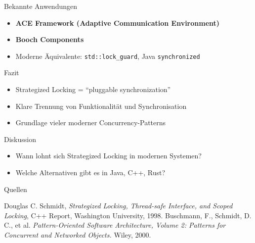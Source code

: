 \documentclass[aspectratio=169,10pt]{beamer}
\begin{document}
\begin{frame}{Bekannte Anwendungen}
  \begin{itemize}
    \item \textbf{ACE Framework (Adaptive Communication Environment)}
    \item \textbf{Booch Components}
    \item Moderne \"Aquivalente: \texttt{std::lock\_guard}, Java \texttt{synchronized}
  \end{itemize}
\end{frame}

\begin{frame}{Fazit}
  \begin{itemize}
    \item Strategized Locking = ``pluggable synchronization''
    \item Klare Trennung von Funktionalit\"at und Synchronisation
    \item Grundlage vieler moderner Concurrency-Patterns
  \end{itemize}
\end{frame}

\begin{frame}{Diskussion}
  \begin{itemize}
    \item Wann lohnt sich Strategized Locking in modernen Systemen?
    \item Welche Alternativen gibt es in Java, C++, Rust?
  \end{itemize}
\end{frame}

\begin{frame}[allowframebreaks]{Quellen}
  \begin{thebibliography}{9}
    Douglas C. Schmidt,
    \emph{Strategized Locking, Thread-safe Interface, and Scoped Locking},
    C++ Report, Washington University, 1998.
    Buschmann, F., Schmidt, D. C., et al.
    \emph{Pattern-Oriented Software Architecture, Volume 2: Patterns for Concurrent and Networked Objects.}
    Wiley, 2000.
  \end{thebibliography}
\end{frame}
\end{document}

